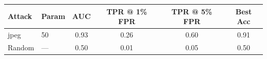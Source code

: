 \begin{tabular}{llcccc}
\toprule
Attack & Param & AUC & TPR @ 1\% FPR & TPR @ 5\% FPR & Best Acc \\
\midrule
jpeg & 50 & 0.93 & 0.26 & 0.60 & 0.91 \\
Random & — & 0.50 & 0.01 & 0.05 & 0.50 \\
\bottomrule
\end{tabular}
